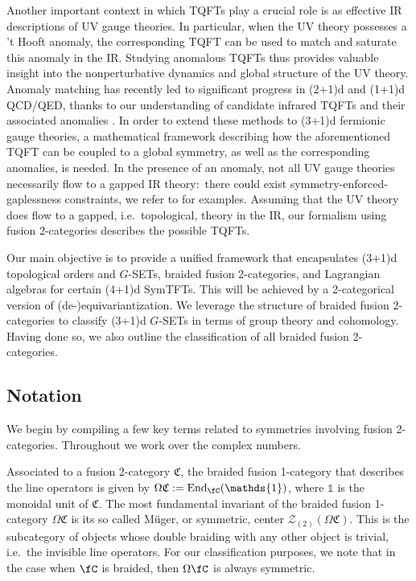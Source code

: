 \documentclass[11pt,reqno]{amsart}
\DeclareMathOperator{\End}{End}
\numberwithin{equation}{section}
\theoremstyle{plain}
\theoremstyle{definition}
\begin{document}
Another important context in which TQFTs play a crucial role is as effective IR descriptions of UV gauge theories. In particular, when the UV theory possesses a 't Hooft anomaly, the corresponding TQFT can be used to match and saturate this anomaly in the IR. Studying anomalous TQFTs thus provides valuable insight into the nonperturbative dynamics and global structure of the UV theory.  Anomaly matching has recently led to significant progress in (2+1)d and (1+1)d QCD/QED, thanks to our understanding of candidate infrared TQFTs and their associated anomalies \cite{Gomis:2017ixy,Cordova:2017vab,Benini:2017dus,Komargodski:2017keh,Cordova:2017kue,Choi:2018tuh,Cordova:2018qvg,Delmastro:2021otj}. In order to extend these methods to (3+1)d fermionic gauge theories, a mathematical framework describing how the aforementioned TQFT can be coupled to a global symmetry, as well as the corresponding anomalies, is needed. In the presence of an anomaly, not all UV gauge theories necessarily flow to a gapped IR theory:\ there could exist symmetry-enforced-gaplessness constraints, we refer to \cite{CO1,CO2} for examples. Assuming that the UV theory does flow to a gapped, i.e.\ topological, theory in the IR, our formalism using fusion 2-categories describes the possible TQFTs.

Our main objective is to provide a unified framework that encapsulates (3+1)d topological orders and $G$-SETs, braided fusion 2-categories, and Lagrangian algebras for certain (4+1)d SymTFTs. This will be achieved by a 2-categorical version of (de-)equivariantization. We leverage the structure of braided fusion 2-categories to classify (3+1)d $G$-SETs in terms of group theory and cohomology.
Having done so, we also outline the classification of all braided fusion 2-categories. 

\subsection*{Notation}\label{section:notation}
We begin by compiling a few key terms related to
symmetries involving fusion 2-categories. Throughout we work over the complex numbers.

Associated to a fusion 2-category $\mathfrak{C}$, the braided fusion 1-category that describes the line operators is given by $\Omega\mathfrak{C} := \End_{\fC}(\mathds{1})$, where $\mathds{1}$ is the monoidal unit of $\mathfrak{C}$. 
The most fundamental invariant of the braided fusion 1-category $\Omega\mathfrak{C}$ is its so called M\"uger, or symmetric, center $\mathcal{Z}_{(2)}(\Omega \mathfrak{C})$. This is the subcategory of objects whose double braiding with any other object is trivial, i.e.\ the invisible line operators. For our classification purposes, we note that in the case when $\fC$ is braided, then $\Omega \fC$ is always symmetric. 
\end{document}
